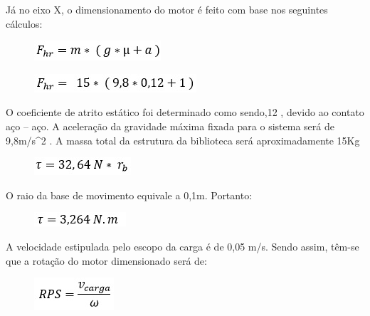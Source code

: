 Já no eixo X, o dimensionamento do motor é feito com base nos seguintes cálculos:

\begin{figure}[!h]
\centering
\includegraphics[scale=0.8, angle = 360]{figuras/formula1}
\caption[]{}
\end{figure}
\FloatBarrier

\begin{figure}[!h]
\centering
\includegraphics[scale=0.8, angle = 360]{figuras/formula2}
\caption[]{}
\end{figure}
\FloatBarrier

O coeficiente de atrito estático foi determinado como sendo,12 , devido ao contato aço – aço. A aceleração da gravidade máxima fixada para o sistema será de 9,8m/s^2 . A massa total da estrutura da biblioteca será aproximadamente 15Kg

\begin{figure}[!h]
\centering
\includegraphics[scale=0.8, angle = 360]{figuras/formula3}
\caption[]{}
\end{figure}
\FloatBarrier

O raio da base de movimento equivale a 0,1m. Portanto:

\begin{figure}[!h]
\centering
\includegraphics[scale=0.8, angle = 360]{figuras/formula4}
\caption[]{}
\end{figure}
\FloatBarrier

A velocidade estipulada pelo escopo da carga é de 0,05 m/s. Sendo assim, têm-se que a rotação do motor dimensionado será de:
 
\begin{figure}[!h]
\centering
\includegraphics[scale=0.8, angle = 360]{figuras/formula5}
\caption[]{}
\end{figure}
\FloatBarrier


